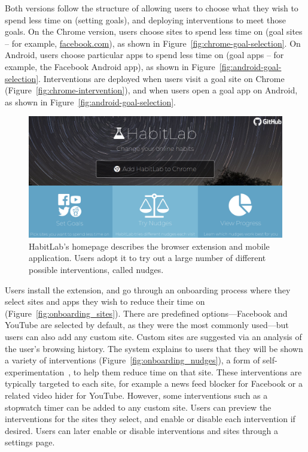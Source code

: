 Both versions follow the structure of allowing users to choose what they wish to spend less time on (setting goals), and deploying interventions to meet those goals. %
On the Chrome version, users choose sites to spend less time on (goal sites -- for example, \url{facebook.com}), as shown in Figure~\ref{fig:chrome-goal-selection}. On Android, users choose particular apps to spend less time on (goal apps -- for example, the Facebook Android app), as shown in Figure~\ref{fig:android-goal-selection}. Interventions are deployed when users visit a goal site on Chrome (Figure~\ref{fig:chrome-intervention}), and when users open a goal app on Android, as shown in Figure~\ref{fig:android-goal-selection}.

\begin{figure}
\includegraphics[width=\linewidth]{figures/homepage_cropped}
\caption{HabitLab's homepage describes the browser extension and mobile application. Users adopt it to try out a large number of different possible interventions, called nudges.}
\label{fig:homepage}
\end{figure}


Users install the extension, and go through an onboarding process where they select sites and apps they wish to reduce their time on (Figure~\ref{fig:onboarding_sites}). There are predefined options---Facebook and YouTube are selected by default, as they were the most commonly used---but users can also add any custom site. Custom sites are suggested via an analysis of the user's browsing history. The system explains to users that they will be shown a variety of interventions (Figure~\ref{fig:onboarding_nudges}), a form of self-experimentation~\cite{Karkar:2017:TFS:3025453.3025480}, to help them reduce time on that site. These interventions are typically targeted to each site, for example a news feed blocker for Facebook or a related video hider for YouTube. However, some interventions such as a stopwatch timer can be added to any custom site. Users can preview the interventions for the sites they select, and enable or disable each intervention if desired. Users can later enable or disable interventions and sites through a settings page.

